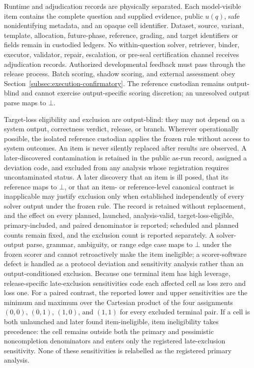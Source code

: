 \documentclass[10pt]{article} %
\providecommand{\1}{\mathbf{1}}  %
\theoremstyle{remark}
\theoremstyle{definition}
\begin{document}
Runtime and adjudication records are physically separated. Each model-visible
item contains the complete question and supplied evidence, public $u(q)$,
safe nonidentifying metadata, and an opaque cell identifier. Dataset, source,
variant, template, allocation, future-phase, reference, grading, and target
identifiers or fields remain in custodied ledgers. No within-question solver,
retriever, binder, executor, validator, repair, escalation, or pre-seal
certification channel receives adjudication records. Authorized developmental
feedback must pass through the release process. Batch scoring, shadow scoring,
and external assessment obey Section~\ref{subsec:execution-confirmatory}.
The reference custodian remains output-blind and cannot exercise
output-specific scoring discretion; an unresolved output parse maps to $\bot$.

Target-loss eligibility and exclusion are output-blind: they may not depend on a system output, correctness verdict, release, or branch. Wherever operationally possible, the isolated reference custodian applies the frozen rule without access to system outcomes. An item is never silently replaced after results are observed. A later-discovered contamination is retained in the public as-run record, assigned a deviation code, and excluded from any analysis whose registration requires uncontaminated status. A later discovery that an item is ill posed, that its reference maps to $\bot$, or that an item- or reference-level canonical contract is inapplicable may justify exclusion only when established independently of every solver output under the frozen rule. The record is retained without replacement, and the effect on every planned, launched, analysis-valid, target-loss-eligible, primary-included, and paired denominator is reported; scheduled and planned counts remain fixed, and the exclusion count is reported separately. A solver-output parse, grammar, ambiguity, or range edge case maps to $\bot$ under the frozen scorer and cannot retroactively make the item ineligible; a scorer-software defect is handled as a protocol deviation and sensitivity analysis rather than an output-conditioned exclusion. Because one terminal item has high leverage, release-specific late-exclusion sensitivities code each affected cell as loss zero and loss one. For a paired contrast, the reported lower and upper sensitivities are the minimum and maximum over the Cartesian product of the four assignments $(0,0)$, $(0,1)$, $(1,0)$, and $(1,1)$ for every excluded terminal pair. If a cell is both unlaunched and later found item-ineligible, item ineligibility takes precedence: the cell remains outside both the primary and pessimistic noncompletion denominators and enters only the registered late-exclusion sensitivity. None of these sensitivities is relabelled as the registered primary analysis.
\end{document}
